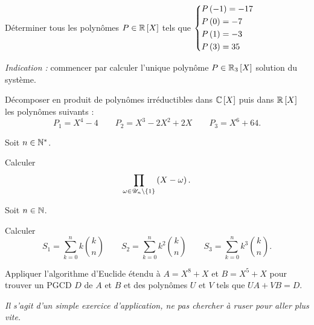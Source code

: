 \begin{corr}
\end{corr}

\begin{exo}[Exercice 4]
Déterminer tous les polynômes \(P\in\poly[\R]\) tels que \(\begin{dcases}P\left(-1\right)=-17 \\ P\left(0\right)=-7 \\ P\left(1\right)=-3 \\ P\left(3\right)=35\end{dcases}\)

\textit{Indication :} commencer par calculer l'unique polynôme \(P\in\polydeg[\R]{3}\) solution du système.
\end{exo}

\begin{corr}
\end{corr}

\begin{exo}[Exercice 5]
Décomposer en produit de polynômes irréductibles dans \(\poly[\C]\) puis dans \(\poly[\R]\) les polynômes suivants : \[P_1=X^4-4\qquad P_2=X^3-2X^2+2X\qquad P_3=X^6+64.\]
\end{exo}

\begin{corr}
\end{corr}

\begin{exo}[Exercice 6]
Soit \(n\in\mathbb{N}^*\).

Calculer \[\prod_{\omega\in\mathscr{U}_n\setminus\left\lbrace1\right\rbrace}\left(X-\omega\right).\]
\end{exo}

\begin{corr}
\end{corr}

\begin{exo}[Exercice 7]
Soit \(n\in\mathbb{N}\).

Calculer \[S_1=\sum_{k=0}^nk\binom{k}{n}\qquad S_2=\sum_{k=0}^nk^2\binom{k}{n}\qquad S_3=\sum_{k=0}^nk^3\binom{k}{n}.\]
\end{exo}

\begin{corr}
\end{corr}

\begin{exo}
Appliquer l'algorithme d'Euclide étendu à \(A=X^8+X\) et \(B=X^5+X\) pour trouver un PGCD \(D\) de \(A\) et \(B\) et des polynômes \(U\) et \(V\) tels que \(UA+VB=D\).

\textit{Il s'agit d'un simple exercice d'application, ne pas chercher à ruser pour aller plus vite.}
\end{exo}

